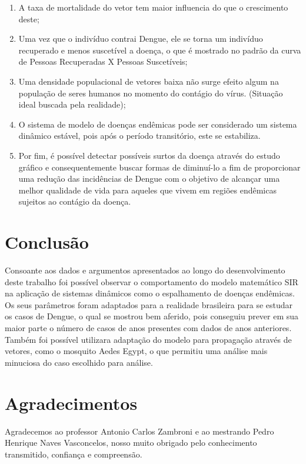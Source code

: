 \documentclass[conference]{IEEEtran}
\begin{document}
\begin{enumerate}
    \item A taxa de mortalidade do vetor tem maior influencia do que o crescimento deste;
    
    \item Uma vez que o indivíduo contrai Dengue, ele se torna um indivíduo recuperado e menos suscetível a doença, o que é mostrado no padrão da curva de Pessoas Recuperadas X Pessoas Suscetíveis;
    
    \item Uma densidade populacional de vetores baixa não surge efeito algum na população de seres humanos no momento do contágio do vírus. (Situação ideal buscada pela realidade);
    
    \item O sistema de modelo de doenças endêmicas pode ser considerado um sistema dinâmico estável, pois após o período transitório, este se estabiliza.
    
    
    \item Por fim, é possível detectar possíveis surtos da doença através do estudo gráfico e consequentemente  buscar formas de diminuí-lo a fim de proporcionar uma redução das incidências de Dengue com o objetivo de alcançar uma melhor qualidade de vida para aqueles que vivem em regiões endêmicas sujeitos ao contágio da doença.
    
\end{enumerate}

\section{Conclusão}

Consoante aos dados e argumentos apresentados ao longo do desenvolvimento deste trabalho foi possível observar o comportamento do modelo matemático SIR na aplicação de sistemas dinâmicos como o espalhamento de doenças endêmicas. Os seus parâmetros foram adaptados para a realidade brasileira para se estudar os casos de Dengue, o qual se mostrou bem aferido, pois conseguiu prever em sua maior parte o número de casos de anos presentes com dados de anos anteriores. Também foi possível utilizara adaptação do modelo para propagação através de vetores, como o mosquito Aedes Egypt, o que permitiu uma análise mais minuciosa do caso escolhido para análise.

\section*{Agradecimentos}
Agradecemos ao professor Antonio Carlos Zambroni e ao mestrando Pedro Henrique Naves Vasconcelos, nosso muito obrigado pelo conhecimento transmitido, confiança e compreensão. 
\end{document}
